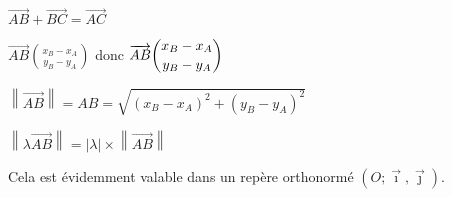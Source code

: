 $\overrightarrow{AB} + \overrightarrow{BC} = \overrightarrow{AC}$\medskip

$\overrightarrow{AB}\binom{x_B - x_A}{y_B - y_A}$ \quad donc \quad
$\overrightarrow{AB}\dbinom{x_B - x_A}{y_B - y_A}$\par\medskip
$\left\lVert \overrightarrow{AB} \right\rVert = AB = \sqrt{(x_B - x_A)^2 + (y_B - y_A)^2}$

\medskip

$\left\lVert \lambda \overrightarrow{AB}\right\rVert =
\left\lvert \lambda \right\rvert \times \left\lVert \overrightarrow{AB}\right\rVert$\par\medskip
Cela est évidemment valable dans un repère orthonormé
$\left(O ; \overrightarrow\imath, \overrightarrow\jmath\right)$.